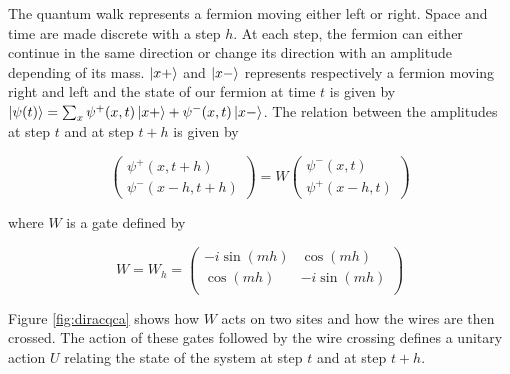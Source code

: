 \documentclass{article}
\begin{document}
The quantum walk represents a fermion moving either left or right. Space and time are made discrete with a step $h$. At each step, the fermion can either continue in the same direction or change its direction with an amplitude depending of its mass. $\ket{x+}$ and $\ket{x-}$ represents respectively a fermion moving right and left and the state of our fermion at time $t$ is given by $\ket{\psi(t)} = \sum_x \psi^+(x, t)\ket{x+}+\psi^-(x, t)\ket{x-}$. The relation between the amplitudes at step $t$ and at step $t+h$ is given by

\begin{equation}
 \begin{pmatrix}
  \psi^+(x, t + h) \\
  \psi^-(x-h, t + h)
 \end{pmatrix} = W \begin{pmatrix}
  \psi^-(x, t) \\
  \psi^+(x-h, t)
 \end{pmatrix}
\end{equation}

where $W$ is a gate defined by

\begin{equation}
W = W_h = \begin{pmatrix}
-i\sin(mh) & \cos(mh) \\
\cos(mh) & -i\sin(mh) \\
\end{pmatrix}
\end{equation}

Figure \ref{fig:diracqca} shows how $W$ acts on two sites and how the wires are then crossed. The action of these gates followed by the wire crossing defines a unitary action $U$ relating the state of the system at step $t$ and at step $t + h$.
\end{document}
